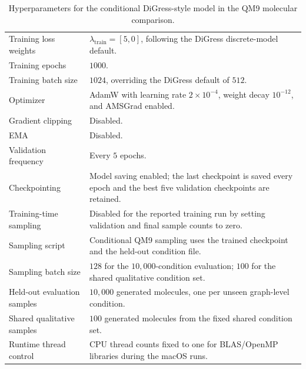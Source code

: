\begin{table}[p]
\begin{tabularx}{\textwidth}{@{}p{}X@{}}
Training loss weights & \(\lambda_{\mathrm{train}}=[5,0]\), following the DiGress discrete-model default. \\
Training epochs & \(1000\). \\
Training batch size & \(1024\), overriding the DiGress default of \(512\). \\
Optimizer & AdamW with learning rate \(2\times 10^{-4}\), weight decay \(10^{-12}\), and AMSGrad enabled. \\
Gradient clipping & Disabled. \\
EMA & Disabled. \\
Validation frequency & Every \(5\) epochs. \\
Checkpointing & Model saving enabled; the last checkpoint is saved every epoch and the best five validation checkpoints are retained. \\
Training-time sampling & Disabled for the reported training run by setting validation and final sample counts to zero. \\
Sampling script & Conditional QM9 sampling uses the trained checkpoint and the held-out condition file. \\
Sampling batch size & \(128\) for the \(10{,}000\)-condition evaluation; \(100\) for the shared qualitative condition set. \\
Held-out evaluation samples & \(10{,}000\) generated molecules, one per unseen graph-level condition. \\
Shared qualitative samples & \(100\) generated molecules from the fixed shared condition set. \\
Runtime thread control & CPU thread counts fixed to one for BLAS/OpenMP libraries during the macOS runs. \\
\bottomrule
\end{tabularx}
\caption{Hyperparameters for the conditional DiGress-style model in the QM9 molecular comparison.}
\label{tab:qm9-digress-hyperparameters}
\end{table}
